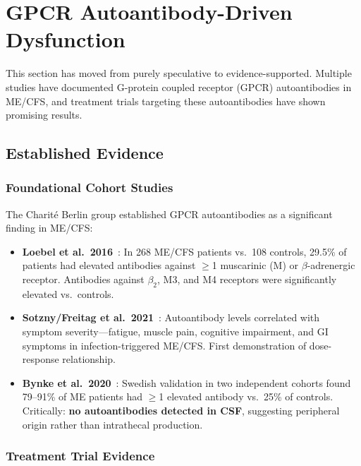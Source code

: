 \section{GPCR Autoantibody-Driven Dysfunction}
\label{sec:gpcr-autoantibodies}

This section has moved from purely speculative to evidence-supported. Multiple studies have documented G-protein coupled receptor (GPCR) autoantibodies in ME/CFS, and treatment trials targeting these autoantibodies have shown promising results.

\subsection{Established Evidence}

\subsubsection{Foundational Cohort Studies}

The Charité Berlin group established GPCR autoantibodies as a significant finding in ME/CFS:

\begin{itemize}
    \item \textbf{Loebel et al.\ 2016}~\cite{Loebel2016}: In 268 ME/CFS patients vs.\ 108 controls, 29.5\% of patients had elevated antibodies against $\geq$1 muscarinic (M) or $\beta$-adrenergic receptor. Antibodies against $\beta_2$, M3, and M4 receptors were significantly elevated vs.\ controls.
    \item \textbf{Sotzny/Freitag et al.\ 2021}~\cite{Sotzny2021}: Autoantibody levels correlated with symptom severity---fatigue, muscle pain, cognitive impairment, and GI symptoms in infection-triggered ME/CFS. First demonstration of dose-response relationship.
    \item \textbf{Bynke et al.\ 2020}~\cite{Bynke2020}: Swedish validation in two independent cohorts found 79--91\% of ME patients had $\geq$1 elevated antibody vs.\ 25\% of controls. Critically: \textbf{no autoantibodies detected in CSF}, suggesting peripheral origin rather than intrathecal production.
\end{itemize}

\subsubsection{Treatment Trial Evidence}

